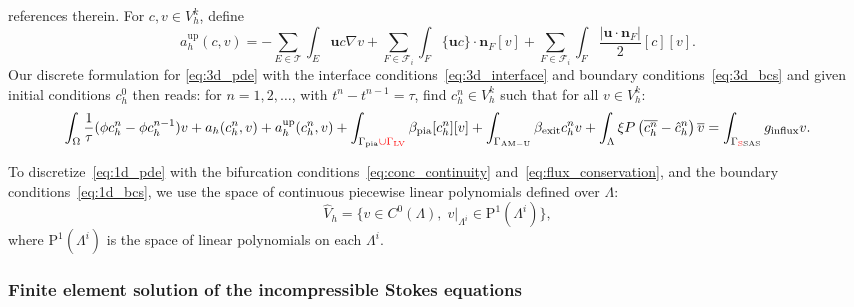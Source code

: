 references therein. For $c, v \in V_h^k$, define
\begin{equation}
  a_h^{\mathrm{up}}(c, v)
  = - \sum_{E \in \mathcal{T}} \int_E \bm{u} c \nabla v
  + \sum_{F \in \mathcal{F}_i } \int_F \{ \bm u  c\} \cdot \bm{n}_F [v] +
  \sum_{F \in \mathcal{F}_i} \int_F \frac{|\bm u \cdot \bm n_F|}{2} [c] [v] .
\end{equation}
Our discrete formulation for \eqref{eq:3d_pde} with the interface conditions~\eqref{eq:3d_interface} and boundary conditions~\eqref{eq:3d_bcs} and given initial conditions $c_h^0$ then reads: for $n = 1, 2, \dots$, with $t^n - t^{n-1} = \tau$, find $c_h^n \in V_h^k$ such that for all $v \in V_h^k$:
\begin{equation}
  \int_{\Omega} \frac{1}{\tau} (\phi c_h^n - \phi c_h^{n-1}) v
  + a_h(c_h^n, v) + a_h^{\mathrm{up}}(c_h^n,v)
  + \int_{\Gamma_{\rm pia} \textcolor{red}{\cup \Gamma_{\rm LV}} } \beta_{\rm pia}[c_h^n][v] 
  + \int_{\Gamma_{\rm AM-U}} \beta_{\rm exit} c_h^n v 
  + \int_{\Lambda} \xi  P \left (\overline{c_h^n} - \hat c_h^n \right) \overline{v} 
  = 
  \int_{\Gamma_{\rm \textcolor{red}{S}SAS}} g_{\rm influx} v
  .
\end{equation}

To discretize~\eqref{eq:1d_pde} with the bifurcation
conditions~\eqref{eq:conc_continuity}
and~\eqref{eq:flux_conservation}, and the boundary
conditions~\eqref{eq:1d_bcs}, we use the space of continuous piecewise
linear polynomials defined over $\Lambda$:
\begin{equation}
  \hat V_h
  = \{ v \in C^0(\Lambda), \; v \vert_{\Lambda^i} \in \mathrm{P}^1(\Lambda^i) \}, 
\end{equation}
where $\mathrm{P}^1(\Lambda^i)$ is the space of linear polynomials on each $\Lambda^i$. 

\subsubsection{Finite element solution of the incompressible Stokes equations}

